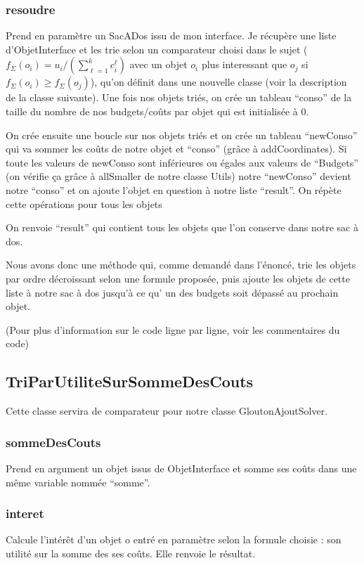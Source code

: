 \documentclass[11pt]{article}
\begin{document}
\subsubsection{resoudre}
Prend en paramètre un SacADos issu de mon interface. Je récupère une liste d’ObjetInterface et les trie selon un comparateur choisi dans le sujet ($f_\Sigma(o_i) = u_i / (\sum_{\ell=1}^{k}c^\ell_i)$ avec un objet $o_i$ plus interessant que $o_j$ si $f_\Sigma(o_i) ≥ f_\Sigma (o_j)$), qu’on définit dans une nouvelle classe (voir la description de la classe suivante). Une fois nos objets triés, on crée un tableau “conso” de la taille du nombre de nos budgets/coûts par objet qui est initialisée à 0.

On crée ensuite une boucle sur nos objets triés et on crée un tableau “newConso” qui va sommer les coûts de notre objet et “conso” (grâce à addCoordinates). Si toute les valeurs de newConso sont inférieures ou égales aux valeurs de “Budgets” (on vérifie ça grâce à allSmaller de notre classe Utils) notre “newConso” devient notre “conso” et on ajoute l’objet en question à notre liste “result”. On répète cette opérations pour tous les objets 

On renvoie “result” qui contient tous les objets que l’on conserve dans notre sac à dos. 

Nous avons donc une méthode qui, comme demandé dans l’énoncé, trie les objets par ordre décroissant selon une formule proposée, puis ajoute les objets de cette liste à notre sac à dos jusqu’à ce qu' un des budgets soit dépassé au prochain objet. 

(Pour plus d’information sur le code ligne par ligne, voir les commentaires du code)


\subsection{TriParUtiliteSurSommeDesCouts}
Cette classe servira de comparateur pour notre classe GloutonAjoutSolver.

\subsubsection{sommeDesCouts}
Prend en argument un objet issus de ObjetInterface et somme ses coûts dans une même variable nommée “somme”.

\subsubsection{interet}
Calcule l’intérêt d’un objet o entré en paramètre selon la formule choisie : son utilité sur la somme des ses coûts. Elle renvoie le résultat.
\end{document}
